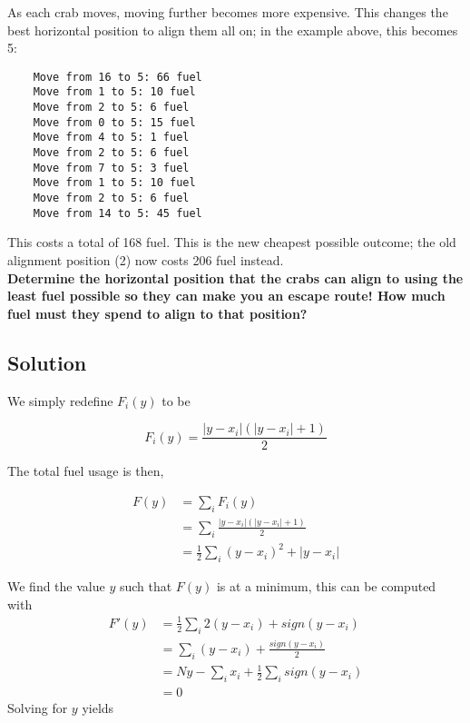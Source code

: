 \documentclass{article}
\begin{document}
As each crab moves, moving further becomes more expensive. This changes the best
horizontal position to align them all on; in the example above, this becomes
5:\\

\begin{verbatim}
    Move from 16 to 5: 66 fuel
    Move from 1 to 5: 10 fuel
    Move from 2 to 5: 6 fuel
    Move from 0 to 5: 15 fuel
    Move from 4 to 5: 1 fuel
    Move from 2 to 5: 6 fuel
    Move from 7 to 5: 3 fuel
    Move from 1 to 5: 10 fuel
    Move from 2 to 5: 6 fuel
    Move from 14 to 5: 45 fuel
\end{verbatim}


This costs a total of 168 fuel. This is the new cheapest possible outcome; the
old alignment position (2) now costs 206 fuel instead.\\

\textbf{Determine the horizontal position that the crabs can align to using the
    least fuel possible so they can make you an escape route! How much fuel must
    they spend to align to that position?}\\


\subsection{Solution}

We simply redefine \(F_i(y)\) to be

\begin{equation}
    F_i(y) = \frac{|y - x_i| (|y - x_i| + 1)}{2}
\end{equation}

The total fuel usage is then,

\begin{align}
    F(y) & = \sum_{i} F_i(y)                              \\
         & = \sum_{i} \frac{|y - x_i| (|y - x_i| + 1)}{2} \\
         & = \frac{1}{2}\sum_{i} (y - x_i)^2 + |y - x_i|
\end{align}


We find the value \(y\) such that \(F(y)\) is at a minimum, this can be computed
with
\begin{align}
    F'(y) & = \frac{1}{2}\sum_{i} 2(y - x_i) + sign(y - x_i)       \\
          & = \sum_{i} (y - x_i) + \frac{sign(y - x_i)}{2}         \\
          & = Ny - \sum_{i}x_i + \frac{1}{2}\sum_{i} sign(y - x_i) \\
          & = 0
\end{align}
Solving for \(y\) yields
\end{document}
